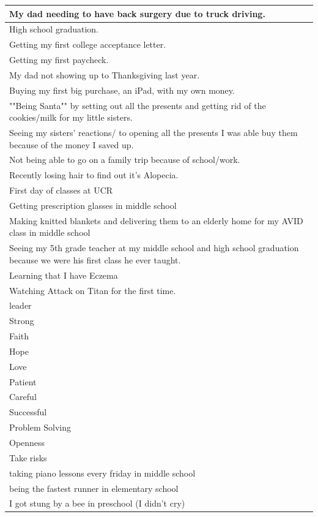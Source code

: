 \documentclass[
  .7em,
  letterpaper,
  DIV=11,
  numbers=noendperiod]{scrartcl}
\begin{document}
\begin{table}
\begin{tabular}{l}
\hline
My dad needing to have back surgery due to truck driving.\\
\hline
High school graduation.\\
\hline
Getting my first college acceptance letter.\\
\hline
Getting my first paycheck.\\
\hline
My dad not showing up to Thanksgiving last year.\\
\hline
Buying my first big purchase, an iPad, with my own money.\\
\hline
""Being Santa"" by setting out all the presents and getting rid of the cookies/milk for my little sisters.\\
\hline
Seeing my sisters' reactions/ to opening all the presents I was able buy them because of the money I saved up.\\
\hline
Not being able to go on a family trip because of school/work.\\
\hline
Recently losing hair to find out it's Alopecia.\\
\hline
First day of classes at UCR\\
\hline
Getting prescription glasses in middle school\\
\hline
Making knitted blankets and delivering them to an elderly home for my AVID class in middle school\\
\hline
Seeing my 5th grade teacher at my middle school and high school graduation because we were his first class he ever taught.\\
\hline
Learning that I have Eczema\\
\hline
Watching Attack on Titan for the first time.\\
\hline
leader\\
\hline
Strong\\
\hline
Faith\\
\hline
Hope\\
\hline
Love\\
\hline
Patient\\
\hline
Careful\\
\hline
Successful\\
\hline
Problem Solving\\
\hline
Openness\\
\hline
Take risks\\
\hline
taking piano lessons every friday in middle school\\
\hline
being the fastest runner in elementary school\\
\hline
I got stung by a bee in preschool (I didn't cry)\\

\end{tabular}
\end{table}
\end{document}
